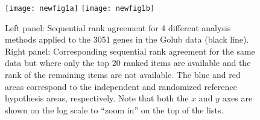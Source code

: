\documentclass[oupdraft]{bio}
\newcommand{\nn}{\nonumber}
\newcommand{\plim}{\operatornamewithlimits{plim}}
\begin{document}

%






\begin{figure}[htbp]
   \begin{center}
 \texttt{[image: newfig1a]}
 \texttt{[image: newfig1b]}
 \end{center}
 \caption{Left panel: Sequential rank agreement for 4 different
   analysis methods applied to the 3051 genes in the Golub data (black
   line). Right panel: Corresponding sequential rank agreement for the
   same data but where only the top 20 ranked items are available and
   the rank of the remaining items are not available. The blue and red
   areas correspond to the independent and randomized reference
   hypothesis areas, respectively. Note that both the $x$ and $y$ axes
   are shown on the log scale to ``zoom in'' on the top of the lists.}
 \label{fig:example1}
 \end{figure}
\end{document}
